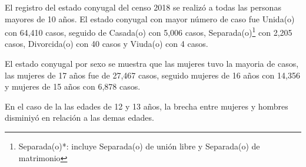 El registro del estado conyugal del censo 2018 se realizó a todas las personas mayores de 10 años. El estado conyugal con mayor número de caso fue Unida(o) con 64,410 casos, seguido de Casada(o) con 5,006 casos, Separada(o)\footnote{Separada(o)*: incluye Separada(o) de unión libre y Separada(o) de matrimonio} con 2,205 casos, Divorcida(o) con 40 casos y Viuda(o) con 4 casos.

El estado conyugal por sexo se muestra que las mujeres tuvo la mayoria de casos, las mujeres de 17 años fue de 27,467 casos, seguido mujeres de 16 años con 14,356 y mujeres de 15 años con 6,878 casos. 

En el caso de la las edades de 12 y 13 años, la brecha entre mujeres y hombres disminiyó en relación a las demas edades.  